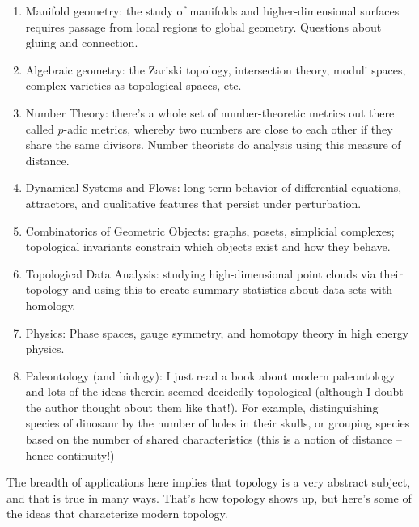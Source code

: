 \documentclass[noname]{notes}
\begin{document}
\begin{enumerate}[(1)]
	\item Manifold geometry: the study of manifolds and higher-dimensional surfaces requires passage from local regions to global geometry. Questions about gluing and connection. 
	\item Algebraic geometry: the Zariski topology, intersection theory, moduli spaces, complex varieties as topological spaces, etc. 
	\item Number Theory: there's a whole set of number-theoretic metrics out there called $p$-adic metrics, whereby two numbers are close to each other if they share the same divisors. Number theorists do analysis using this measure of distance.
	\item Dynamical Systems and Flows: long-term behavior of differential equations,  attractors, and qualitative features that persist under perturbation.
	\item Combinatorics of Geometric Objects: graphs, posets, simplicial complexes; topological invariants constrain which objects exist and how they behave. 
	\item Topological Data Analysis: studying high-dimensional point clouds via their topology and using this to create summary statistics about data sets with homology.
	\item Physics: Phase spaces, gauge symmetry, and homotopy theory in high energy physics.
	\item Paleontology (and biology): I just read a book about modern paleontology and lots of the ideas therein seemed decidedly topological (although I doubt the author thought about them like that!). For example, distinguishing species of dinosaur by the number of holes in their skulls, or grouping species based on the number of shared characteristics (this is a notion of distance -- hence continuity!) 
\end{enumerate}

The breadth of applications here implies that topology is a very abstract subject, and that is true in many ways. That's how topology shows up, but here's some of the ideas that characterize modern topology.  
\end{document}
